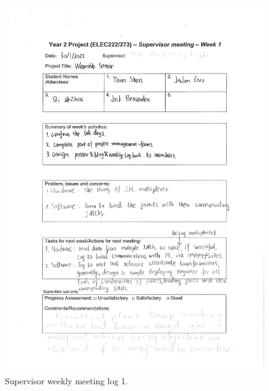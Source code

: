 \documentclass[12pt, a4paper]{report}
\begin{document}
\begin{figure}[htbp]
	\centering
	\includegraphics[width=\textwidth]{
		appendix/meeting-log-1}
	\caption{Supervisor weekly meeting log 1.}
	\label{fig:meeting-log-1}
\end{figure}
\end{document}

